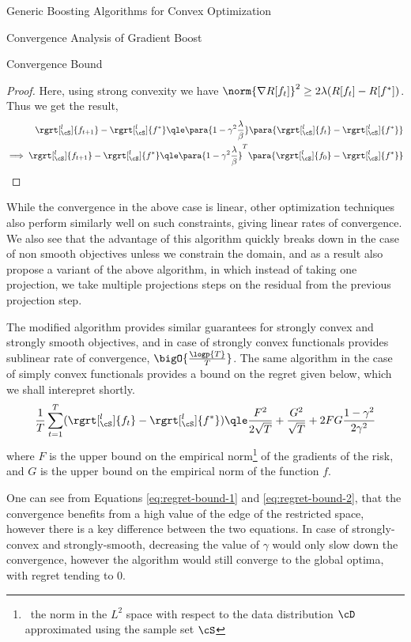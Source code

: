 \documentclass{article}
\begin{document}
\begin{psection}{Generic Boosting Algorithms for Convex Optimization}
\begin{psubsection}{Convergence Analysis of Gradient Boost}
\begin{pssubsection}{Convergence Bound}
\begin{proof}
				Here, using strong convexity we have $\norm{\nabla R[f_t]}^2\geq 2\lambda(R[f_{t}]-R[f^*])$. Thus we get the result,
				\begin{align*}
					\rgrt[_\cS^l]{f_{t + 1}} - \rgrt[_\cS^l]{f^\ast} \qle \para{1 - \gamma^2 \frac{\lambda}{\beta}} \para{\rgrt[_\cS^l]{f_t} - \rgrt[_\cS^l]{f^\ast}} \\
					\implies \rgrt[_\cS^l]{f_{t + 1}} - \rgrt[_\cS^l]{f^\ast} \qle \para{1 - \gamma^2 \frac{\lambda}{\beta}}^T \para{\rgrt[_\cS^l]{f_0} - \rgrt[_\cS^l]{f^\ast}}
				\end{align*}
			\end{proof}

			While the convergence in the above case is linear, other optimization techniques also perform similarly well on such constraints, giving linear rates of convergence. We also see that the advantage of this algorithm quickly breaks down in the case of non smooth objectives unless we constrain the domain, and as a result \cite{cvx-boosting} also propose a variant of the above algorithm, in which instead of taking one projection, we take multiple projections steps on the residual from the previous projection step.

			The modified algorithm \citep[Algorithm 2, ][]{cvx-boosting} provides similar guarantees for strongly convex and strongly smooth objectives, and in case of strongly convex functionals provides sublinear rate of convergence, \ie $\bigO{\frac{\logp{T}}{T}}$. The same algorithm in the case of simply convex functionals provides a bound on the regret given below, which we shall interepret shortly.
			\begin{equation}
				\frac{1}{T}\sum_{t=1}^{T}(\rgrt[_\cS^l]{f_t} - \rgrt[_\cS^l]{f^\ast}) \qle \frac{F^2}{2\sqrt{T}}+\frac{G^2}{\sqrt{T}}+2FG\frac{1-\gamma^2}{2\gamma^2}
				\label{eq:regret-bound-2}
			\end{equation}
			where $F$ is the upper bound on the empirical norm\footnote{\ the norm in the $L^2$ space with respect to the data distribution $\cD$ approximated using the sample set $\cS$} of the gradients of the risk, and $G$ is the upper bound on the empirical norm of the function $f$.

			One can see from Equations \ref{eq:regret-bound-1} and \ref{eq:regret-bound-2}, that the convergence benefits from a high value of the edge of the restricted space, however there is a key difference between the two equations. In case of strongly-convex and strongly-smooth, decreasing the value of $\gamma$ would only slow down the convergence, however the algorithm would still converge to the global optima, with regret tending to 0.


\end{pssubsection}
\end{psubsection}
\end{psection}
\end{document}
